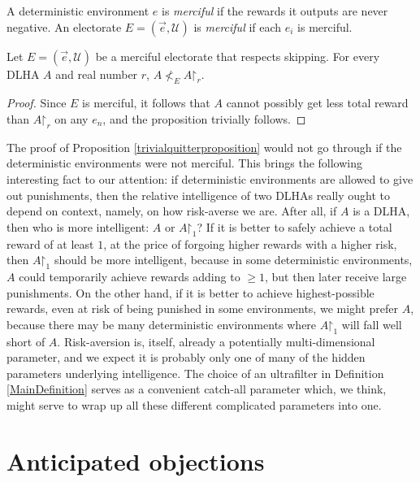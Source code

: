 \documentclass[twoside,11pt]{article}
\begin{document}
\begin{definition}
    A deterministic environment $e$ is \emph{merciful} if
    the rewards it outputs are never negative.
    An electorate $E=(\vec{e},\mathscr U)$ is \emph{merciful}
    if each $e_i$ is merciful.
\end{definition}

\begin{proposition}
\label{trivialquitterproposition}
    Let $E=(\vec{e},\mathscr U)$ be a merciful electorate that respects skipping.
    For every DLHA $A$ and real number $r$, $A\not<_{E}A\mathord{\restriction}_r$.
\end{proposition}

\begin{proof}
    Since $E$ is merciful,
    it follows that $A$ cannot possibly get less total reward than $A\mathord{\restriction}_r$
    on any $e_n$, and the proposition trivially follows.
\end{proof}

The proof of Proposition \ref{trivialquitterproposition} would not go through if
the deterministic environments were not merciful.
This brings the following interesting fact to our attention:
if deterministic environments are allowed to give out punishments,
then the relative intelligence of two DLHAs really ought to depend on
context, namely, on how risk-averse we are.
After all, if $A$ is a DLHA, then who
is more intelligent: $A$ or $A\mathord{\restriction}_1$?
If it is better to safely achieve a total reward of at
least $1$, at the price of forgoing higher rewards with a higher risk,
then $A\mathord{\restriction}_1$
should be more intelligent, because in some deterministic environments,
$A$ could temporarily achieve rewards adding to $\geq 1$, but then later
receive large punishments. On the other hand, if
it is better to achieve highest-possible rewards, even at risk of being punished
in some environments, we might prefer $A$, because there may be many deterministic environments
where $A\mathord{\restriction}_1$ will fall well short of $A$.
Risk-aversion is, itself, already a potentially multi-dimensional parameter, and we
expect it is probably only one of many of the hidden parameters
underlying intelligence. The choice of an ultrafilter in Definition \ref{MainDefinition}
serves as a convenient catch-all parameter which, we think, might serve to wrap up all
these different complicated parameters into one.


\section{Anticipated objections}
\label{objectionsection}
\end{document}
